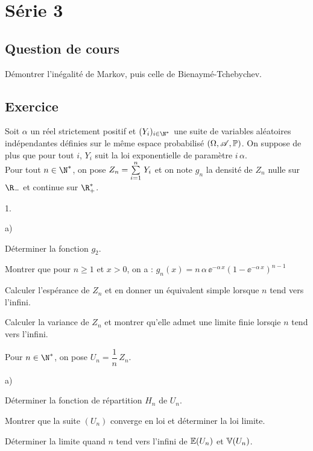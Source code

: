 \documentclass[11pt]{article}%
\begin{document}
\newpage
 
\section*{Série 3}
\subsection*{Question de cours}
\noindent
Démontrer l'inégalité de Markov, puis celle de Bienaymé-Tchebychev.


\subsection*{Exercice} %
\noindent
Soit $\alpha$ un réel strictement positif et $(Y_i)_{i\in\N^*}$ une 
suite de variables aléatoires indépendantes définies sur le même espace 
probabilisé $(\Omega, \mathscr{A}, \mathbb{P})$. On suppose de plus que pour tout 
$i$, $Y_i$ suit la loi exponentielle de paramètre $i \, \alpha$.\\
Pour tout $n\in\N^*$, on pose $Z_n={\textstyle\sum\limits_{i=1}^{n}}\hspace{.1cm} Y_i$ et on note $g_n$ 
la densité de $Z_n$ nulle sur $\R_-$ et continue sur $\R_+^*$.
\begin{noliste}{1.}
 \item 
 \begin{noliste}{a)}
  \item Déterminer la fonction $g_2$.
  \item Montrer que pour $n\geq 1$ et $x>0$, on a : $g_n(x) =
  n \, \alpha \, \ee^{-\alpha \, x}\left(1-\ee^{-\alpha \, 
  x}\right)^{n-1}$
  \item Calculer l'espérance de $Z_n$ et en donner un équivalent simple 
  lorsque $n$ tend vers l'infini.
  \item Calculer la variance de $Z_n$ et montrer qu'elle admet une 
  limite finie lorsqie $n$ tend vers l'infini.
 \end{noliste}
 
 \item Pour $n\in\N^*$, on pose $U_n=\dfrac{1}{n} \, Z_n$.
 \begin{noliste}{a)}
  \item Déterminer la fonction de répartition $H_n$ de $U_n$.
  \item Montrer que la suite $(U_n)$ converge en loi et déterminer 
  la loi limite.
  \item Déterminer la limite quand $n$ tend vers l'infini de $\mathbb{E}(U_n)$ 
  et $\mathbb{V}(U_n)$.
 \end{noliste}
\end{noliste}
\end{document}
